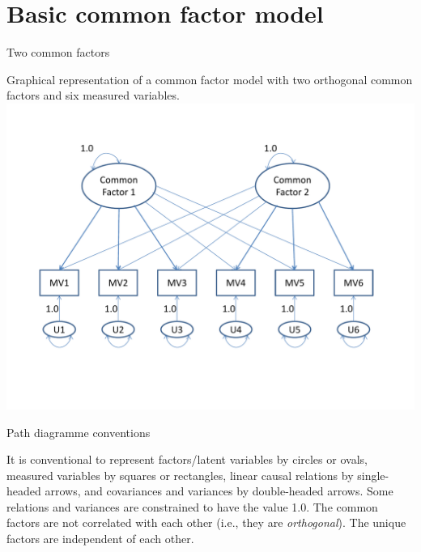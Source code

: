 \documentclass[10pt,ignorenonframetext,]{beamer}
\begin{document}
\section{Basic common factor model}\label{basic-common-factor-model}

\begin{frame}{Two common factors}

Graphical representation of a common factor model with two orthogonal
common factors and six measured variables.
\includegraphics{BasicEFAPath.pdf}

\end{frame}

\begin{frame}{Path diagramme conventions}

It is conventional to represent factors/latent variables by circles or
ovals, measured variables by squares or rectangles, linear causal
relations by single-headed arrows, and covariances and variances by
double-headed arrows. Some relations and variances are constrained to
have the value 1.0. The common factors are not correlated with each
other (i.e., they are \emph{orthogonal}). The unique factors are
independent of each other.

\end{frame}
\end{document}
